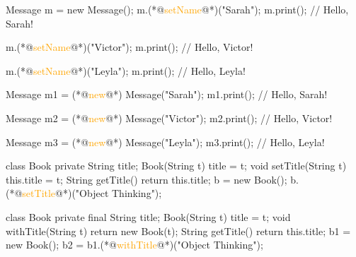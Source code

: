 \documentclass{article}
\begin{document}

\pptToc


\begin{lnSnippet}
Message m = new Message();
m.(*@\textcolor{orange}{setName}@*)("Sarah");
m.print(); // Hello, Sarah!

m.(*@\textcolor{orange}{setName}@*)("Victor");
m.print(); // Hello, Victor!

m.(*@\textcolor{orange}{setName}@*)("Leyla");
m.print(); // Hello, Leyla!
\end{lnSnippet}
\begin{lnSnippet}
Message m1 = (*@\textcolor{orange}{new}@*) Message("Sarah");
m1.print(); // Hello, Sarah!

Message m2 = (*@\textcolor{orange}{new}@*) Message("Victor");
m2.print(); // Hello, Victor!

Message m3 = (*@\textcolor{orange}{new}@*) Message("Leyla");
m3.print(); // Hello, Leyla!
\end{lnSnippet}


\begin{lnSnippet}
class Book {
  private String title;
  Book(String t) { title = t; }
  void setTitle(String t) {
    this.title = t;
  }
  String getTitle() {
    return this.title;
  }
}
b = new Book();
b.(*@\textcolor{orange}{setTitle}@*)("Object Thinking");
\end{lnSnippet}
\begin{lnSnippet}
class Book {
  private final String title;
  Book(String t) { title = t; }
  void withTitle(String t) {
    return new Book(t);
  }
  String getTitle() {
    return this.title;
  }
}
b1 = new Book();
b2 = b1.(*@\textcolor{orange}{withTitle}@*)("Object Thinking");
\end{lnSnippet}
\end{document}
